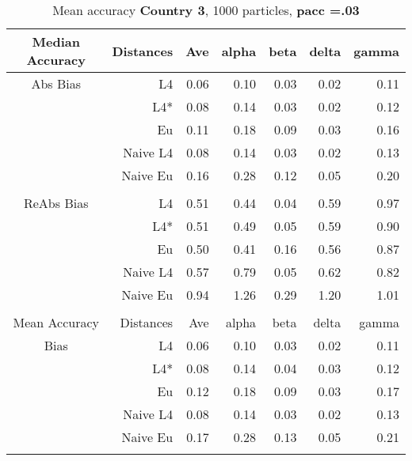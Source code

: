 \documentclass[a4paper,12pt,twoside]{book}
\begin{document}
\begin{table}[H]

\centering
\vfill
\caption{Mean  accuracy \textbf{Country 3}, 1000 particles, \textbf{pacc =.03}}


\begin{tabular}{crrrrrr}
  \hline
  
{\color{blue}Median Accuracy} & Distances & Ave & alpha & beta & delta & gamma \\ 
  \hline
{\color{blue}Abs Bias}& L4  &0.06 & 0.10 & 0.03 & 0.02 & 0.11 \\ 
 
 &L4*  & 0.08 & 0.14 & 0.03 & 0.02 & 0.12 \\ 
  
 
&Eu &   0.11 & 0.18 & 0.09 & 0.03 & 0.16 \\ 
 
 
&Naive L4&      0.08 & 0.14 & 0.03 & 0.02 & 0.13 \\  

&Naive Eu &     0.16 & 0.28 & 0.12 & 0.05 & 0.20 \\ 
  \\ 
   \hline
   
{\color{blue} ReAbs Bias } & L4  &0.51 & 0.44 & 0.04 & 0.59 & 0.97 \\ 
 
&L4*  & 0.51 & 0.49 & 0.05 & 0.59 & 0.90 \\ 
  
&Eu &   
 0.50 & 0.41 & 0.16 & 0.56 & 0.87 \\ 
  
&Naive L4&   
  0.57 & 0.79 & 0.05 & 0.62 & 0.82 \\  
 
&Naive Eu &    0.94 & 1.26 & 0.29 & 1.20 & 1.01 \\  \\ 
   \hline
{\color{blue}Mean Accuracy} & Distances & Ave & alpha & beta & delta & gamma \\ 
  \hline
{\color{blue}Bias} & L4  &0.06 & 0.10 & 0.03 & 0.02 & 0.11 \\ 
  
&L4*  &0.08 & 0.14 & 0.04 & 0.03 & 0.12 \\ 
 
  
&Eu &   0.12 & 0.18 & 0.09 & 0.03 & 0.17 \\ 
 
  
&Naive L4&  
    0.08 & 0.14 & 0.03 & 0.02 & 0.13 \\ 

  
&Naive Eu &    0.17 & 0.28 & 0.13 & 0.05 & 0.21 \\ \\
 

\end{tabular}
\end{table}
\end{document}
